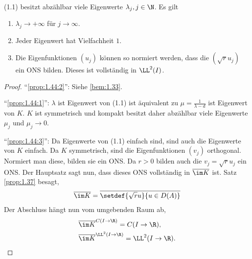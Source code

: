 \begin{prop}
\label{prop:1.44}
(1.1) besitzt abzählbar viele Eigenwerte $\lambda_j, j\in\N$. Es gilt
\begin{enumerate}[label=\arabic{*}.)]
  \item\label{prop:1.44:1} $\lambda_j\to+\infty$ für $j\to\infty$.
  \item\label{prop:1.44:2} Jeder Eigenwert hat Vielfachheit $1$.
  \item\label{prop:1.44:3} Die Eigenfunktionen $(u_j)$ können so normiert
  werden, dass die $(\sqrt{r}u_j)$ ein ONS bilden. Dieses ist vollständig in
  $\LL^2(I)$.\fishhere
\end{enumerate}
\end{prop}
\begin{proof}
``\ref{prop:1.44:2}'': Siehe \ref{bem:1.33}.

``\ref{prop:1.44:1}'': $\lambda$ ist Eigenwert von (1.1) ist äquivalent zu
$\mu=\frac{1}{\lambda-d}$ ist Eigenwert von $K$. $K$ ist symmetrisch und
kompakt besitzt daher abzählbar viele Eigenwerte $\mu_j$ und $\mu_j\to0$.

``\ref{prop:1.44:3}'': Da Eigenwerte von (1.1) einfach sind, sind auch die
Eigenwerte von $K$ einfach. Da $K$ symmetrisch, sind die Eigenfunktionen $(v_j)$
orthogonal. Normiert man diese, bilden sie ein ONS. Da $r>0$ bilden auch die
$v_j=\sqrt{r}u_j$ ein ONS. 
Der Hauptsatz sagt nun, dass dieses ONS vollständig in $\overline{\im K}$ ist.
Satz \ref{prop:1.37} besagt,
\begin{align*}
\overline{\im K} =
\overline{\setdef{\sqrt{r}u}{u\in D(A)}}
\end{align*}
Der Abschluss hängt nun vom umgebenden Raum ab,
\begin{align*}
&\overline{\im K}^{C(I\to\R)} = C(I\to\R),\\
&\overline{\im K}^{\LL^2(I\to\R)} = \LL^2(I\to\R).\qedhere
\end{align*}
\end{proof}

